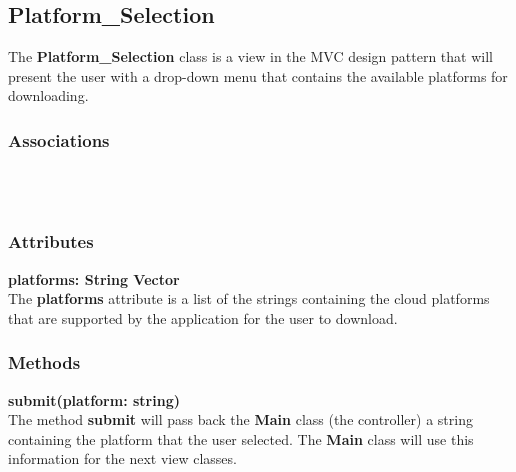 \subsection{Platform\_Selection}
The \textbf{Platform\_Selection} class is a view in the MVC design pattern that will present
the user with a drop-down menu that contains the available platforms for downloading.

\subsubsection{Associations}
\textbf{} \\

\textbf{} \\

\subsubsection{Attributes}
\textbf{platforms: String Vector} \\
The \textbf{platforms} attribute is a list of the strings containing the cloud platforms that
are supported by the application for the user to download.

\subsubsection{Methods}
\textbf{submit(platform: string)} \\
The method \textbf{submit} will pass back the \textbf{Main} class (the controller) a string
containing the platform that the user selected. The \textbf{Main} class will use this information
for the next view classes.
  
